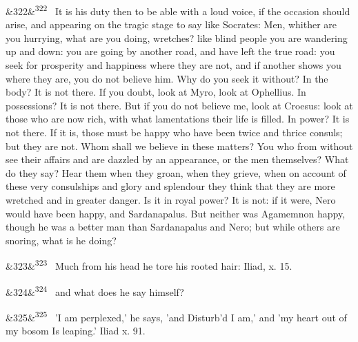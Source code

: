 \documentclass[12pt]{article}
\newcommand{\para}[1][]{\par\noindent\ifx&#1&\else\textsuperscript{\footnotesize #1}~\fi}
\begin{document}
\para[322] It is his duty then to be able with a loud voice, if the occasion should arise, and appearing on the tragic stage to say like Socrates: Men, whither are you hurrying, what are you doing, wretches? like blind people you are wandering up and down: you are going by another road, and have left the true road: you seek for prosperity and happiness where they are not, and if another shows you where they are, you do not believe him. Why do you seek it without? In the body? It is not there. If you doubt, look at Myro, look at Ophellius. In possessions? It is not there. But if you do not believe me, look at Croesus: look at those who are now rich, with what lamentations their life is filled. In power? It is not there. If it is, those must be happy who have been twice and thrice consuls; but they are not. Whom shall we believe in these matters? You who from without see their affairs and are dazzled by an appearance, or the men themselves? What do they say? Hear them when they groan, when they grieve, when on account of these very consulships and glory and splendour they think that they are more wretched and in greater danger. Is it in royal power? It is not: if it were, Nero would have been happy, and Sardanapalus. But neither was Agamemnon happy, though he was a better man than Sardanapalus and Nero; but while others are snoring, what is he doing?

\para[323] Much from his head he tore his rooted hair: Iliad, x. 15.

\para[324] and what does he say himself?

\para[325] 'I am perplexed,' he says, 'and Disturb'd I am,' and 'my heart out of my bosom Is leaping.' Iliad x. 91.
\end{document}
